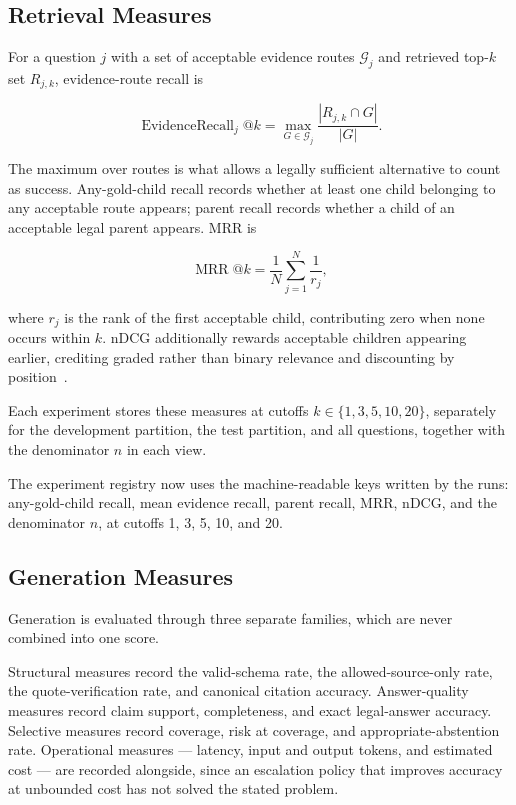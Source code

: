 \subsection{Retrieval Measures}

For a question $j$ with a set of acceptable evidence routes $\mathcal{G}_j$ and retrieved top-$k$ set $R_{j,k}$, evidence-route recall is

\begin{equation}
\operatorname{EvidenceRecall}_{j}@k =
\max_{G \in \mathcal{G}_j}
\frac{|R_{j,k} \cap G|}{|G|}.
\label{eq:evidence-recall}
\end{equation}

The maximum over routes is what allows a legally sufficient alternative to count as success. Any-gold-child recall records whether at least one child belonging to any acceptable route appears; parent recall records whether a child of an acceptable legal parent appears. \ac{MRR} is

\begin{equation}
\operatorname{MRR}@k =
\frac{1}{N}\sum_{j=1}^{N}\frac{1}{r_j},
\label{eq:mrr}
\end{equation}

where $r_j$ is the rank of the first acceptable child, contributing zero when none occurs within $k$. \ac{nDCG} additionally rewards acceptable children appearing earlier, crediting graded rather than binary relevance and discounting by position~\cite{jarvelin2002cumulated}.

Each experiment stores these measures at cutoffs $k \in \{1, 3, 5, 10, 20\}$, separately for the development partition, the test partition, and all questions, together with the denominator $n$ in each view.

The experiment registry now uses the machine-readable keys written by the runs: any-gold-child recall, mean evidence recall, parent recall, \ac{MRR}, \ac{nDCG}, and the denominator $n$, at cutoffs 1, 3, 5, 10, and 20.

\subsection{Generation Measures}

Generation is evaluated through three separate families, which are never combined into one score.

Structural measures record the valid-schema rate, the allowed-source-only rate, the quote-verification rate, and canonical citation accuracy. Answer-quality measures record claim support, completeness, and exact legal-answer accuracy. Selective measures record coverage, risk at coverage, and appropriate-abstention rate. Operational measures --- latency, input and output tokens, and estimated cost --- are recorded alongside, since an escalation policy that improves accuracy at unbounded cost has not solved the stated problem.

